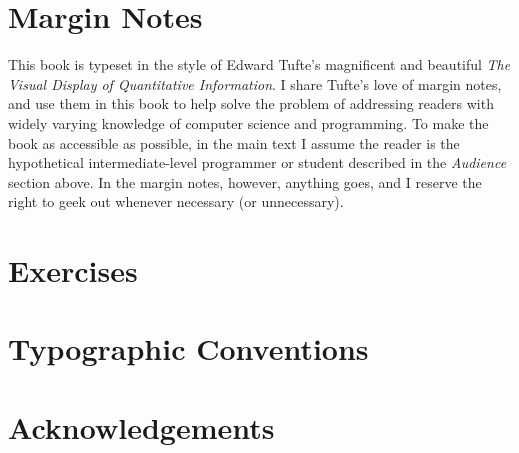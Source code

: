 \section{Margin Notes}\label{sec:preface:margin-notes}

This book is typeset in the style of Edward Tufte's
magnificent and beautiful \emph{The Visual Display of
  Quantitative Information}\cite{Tufte:1986:VDQ:33404}.  I share
Tufte's love of margin notes,
and use them in this book to help solve the problem of addressing readers with
widely varying knowledge of computer science and programming.
%
To make the book as accessible as possible, in the main text I assume
the reader is the hypothetical intermediate-level programmer or
student described in the \emph{Audience} section above.
%
In the margin notes, however, anything goes, and I reserve the right
to geek out whenever necessary (or unnecessary).


\section{Exercises}\label{sec:preface:exercises}


\section{Typographic Conventions}\label{sec:preface:typographic-conventions}



\section{Acknowledgements}\label{sec:preface:acknowledgements}




